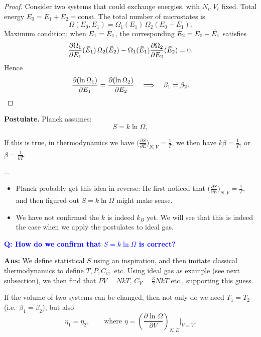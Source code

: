 \begin{proof}
Consider two systems that could exchange energies, with $N_i,V_i$ fixed.
Total energy $E_0 = E_1+E_2 = \mathrm{const}$.
The total number of microstates is
\[
    \Omega(E_0,E_1) = \Omega_1(E_1)\,\Omega_2(E_0-E_1).
\]
Maximum condition: when $E_1 = \bar{E}_1$, the corresponding $\bar{E}_2 = E_0-\bar{E}_1$ satisfies
\[
    \frac{\partial\Omega_1}{\partial E_1}(\bar{E}_1)\,\Omega_2(\bar{E}_2) - \Omega_1(\bar{E}_1)\frac{\partial\Omega_2}{\partial E_2}(\bar{E}_2) = 0.
\]
Hence
\[
    \frac{\partial(\ln\Omega_1)}{\partial E_1} = \frac{\partial(\ln\Omega_2)}{\partial E_2}
    \quad\Longrightarrow\quad \beta_1 = \beta_2. \qedhere
\]
\end{proof}

\begin{framed}
    \textbf{Postulate.} Planck assumes: 
    \[
        S = k\ln\Omega,
    \]
\end{framed}
If this is true, in thermodynamics we have $\bigl(\frac{\partial S}{\partial E}\bigr)_{N,V} = \frac{1}{T}$, we then have $k\beta = \tfrac{1}{T}$, or $\beta = \tfrac{1}{kT}$.

\begin{remark}
    ...
    \begin{itemize}
        \item Planck probably get this idea in reverse: He first noticed that $\bigl(\frac{\partial S}{\partial E}\bigr)_{N,V} = \frac{1}{T}$, and then figured out $S = k\ln\Omega$ might make sense. 
        \item We have not confirmed the $k$ is indeed $k_B$ yet. We will see that this is indeed the case when we apply the postulates to ideal gas.
    \end{itemize}
\end{remark}

\textbf{\textcolor{blue}{Q: How do we confirm that $S=k\ln\Omega$ is correct?}}

\textbf{Ans:} We define statistical $S$ using an inspiration, and then imitate classical thermodynamics to define $T,P,C_v,$ etc. 
Using ideal gas as example (see next subsection), we then find that $PV=NkT$, $C_V=\frac{3}{2}NkT$ etc., supporting this guess.

\begin{proposition}
If the volume of two systems can be changed, then not only do we need $T_1=T_2$ (i.e.\ $\beta_1=\beta_2$), but also
\[
    \eta_1 = \eta_2,\qquad \text{where } \eta = \left(\frac{\partial\ln\Omega}{\partial V}\right)_{N,E}\bigg|_{V=\bar V}.
\]
\end{proposition}

